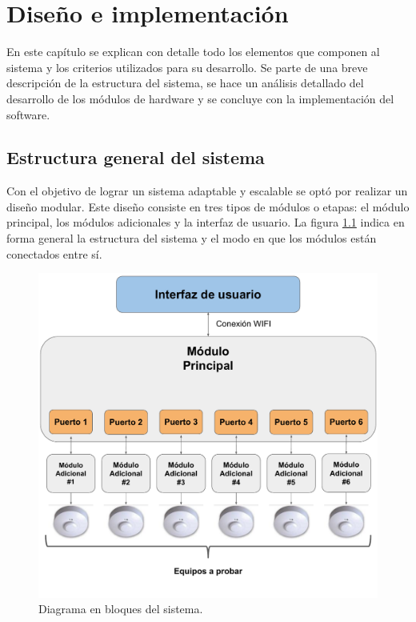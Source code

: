\chapter{Diseño e implementación} %

\label{Chapter3} %


En este capítulo se explican con detalle todo los elementos que componen al sistema y los criterios utilizados para su desarrollo. Se parte de una breve descripción de la estructura del sistema, se hace un análisis detallado del desarrollo de los módulos de hardware y se concluye con la implementación del software.


\section{Estructura general del sistema}
Con el objetivo de lograr un sistema adaptable y escalable se optó por realizar un diseño modular. Este diseño consiste en tres tipos de módulos o etapas: el módulo principal, los módulos adicionales y la interfaz de usuario. La figura \ref{fig:BloquesGral} indica en forma general la estructura del sistema y el modo en que los módulos están conectados entre sí.


\begin{figure}[ht]
	\centering
	\includegraphics[scale=0.5]{./Figures/BloquesGral.pdf}
	\caption{Diagrama en bloques del sistema.}
	\label{fig:BloquesGral}
\end{figure}

